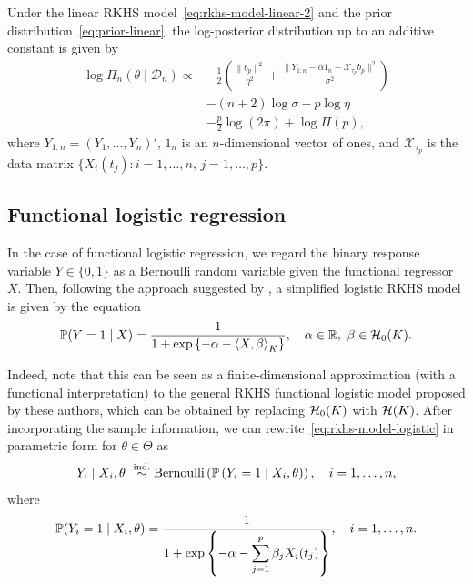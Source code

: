 \begin{proposition}
  Under the linear \acs{RKHS} model~\eqref{eq:rkhs-model-linear-2} and the prior distribution~\eqref{eq:prior-linear}, the log-posterior distribution up to an additive constant is given by
  \begin{align*}
    \log\Pi_n(\theta\mid \mathcal D_n) \propto & -\frac{1}{2}\left(\frac{\|b_p\|^2}{\eta^2} + \frac{\|Y_{1:n} - \alpha 1_n - \mathcal X_{\tau_p} b_p\|^2}{\sigma^2} \right)\\
    &- (n+2)\log \sigma - p\log \eta\\
    &- \frac{p}{2}\log(2\pi) + \log \Pi(p),
  \end{align*}
  where \(Y_{1:n}=(Y_1,\dots,Y_n)'\), \(1_n\) is an \(n\)-dimensional vector of ones, and \(\mathcal X_{\tau_p}\) is the data matrix \(\{X_i(t_j): i=1,\dots,n,\, j=1,\dots,p\}\).
\end{proposition}

\subsection{Functional logistic regression}\label{sec:rkhs-logistic-model}

In the case of functional logistic regression, we regard the binary response variable \(Y\in\{0, 1\}\) as a Bernoulli random variable given the functional regressor \(X\). Then, following the approach suggested by \citet{berrendero2023functional}, a simplified logistic \acs{RKHS} model is given by the equation
\begin{equation}\label{eq:rkhs-model-logistic}
  \mathbb{P}(Y=1 \mid X) = \frac{1}{1 + \exp\left\{-\alpha - \left\langle X,\beta\right\rangle_K\right\}}, \quad \alpha \in \mathbb{R}, \ \beta \in \mathcal{H}_{0}(K).
\end{equation}

Indeed, note that this can be seen as a finite-dimensional approximation (with a functional interpretation) to the general \acs{RKHS} functional logistic model proposed by these authors, which can be obtained by replacing \(\mathcal{H}_{0}(K)\) with \(\mathcal{H}(K)\). After incorporating the sample information, we can rewrite~\eqref{eq:rkhs-model-logistic} in parametric form for \(\theta\in\Theta\) as
\begin{equation}\label{eq:rkhs-model-logistic-2}
  Y_i \mid X_i,\theta \ \stackrel{\text{ind.}}{\sim} \operatorname{Bernoulli}\left(\mathbb{P}\left(Y_i=1 \mid X_i,\theta\right)\right), \quad i=1,\dots, n,
\end{equation}
where
\[
  \mathbb{P}(Y_i=1 \mid X_i,\theta) = \frac{1}{\displaystyle 1 + \exp\left\{-\alpha - \sum_{j=1}^p \beta_j X_i(t_j)\right\}}, \quad i=1,\dots, n.
\]

